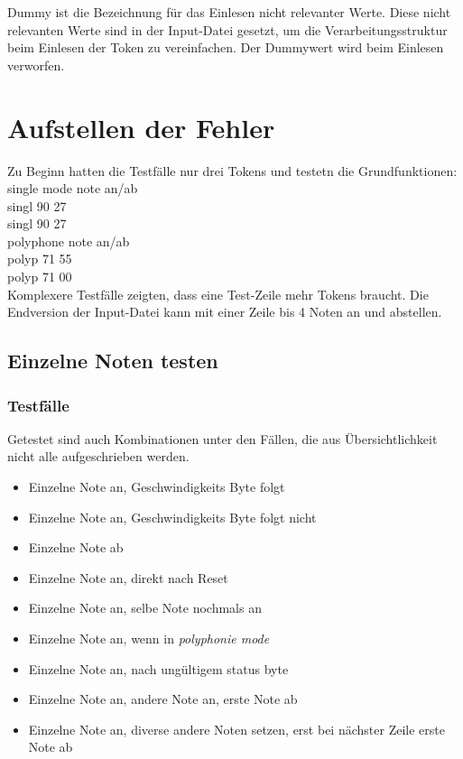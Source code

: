 Dummy ist die Bezeichnung für das Einlesen nicht relevanter Werte. Diese nicht relevanten Werte sind in der Input-Datei gesetzt, um die Verarbeitungsstruktur beim Einlesen der Token zu vereinfachen. Der Dummywert wird beim Einlesen verworfen.\\
 
\section{Aufstellen der Fehler}\label{sec.testbench_fehler} 

Zu Beginn hatten die Testfälle nur drei Tokens und testetn die Grundfunktionen:\\

single mode note an/ab\\
singl 90 27\\ 
singl 90 27\\

polyphone note an/ab\\
polyp 71 55\\
polyp 71 00\\

Komplexere Testfälle zeigten, dass eine Test-Zeile mehr Tokens braucht. Die Endversion der Input-Datei kann mit einer Zeile bis 4 Noten an und abstellen.


\subsection{Einzelne Noten testen}
 
\subsubsection{Testfälle}
Getestet sind auch Kombinationen unter den Fällen, die aus Übersichtlichkeit nicht alle aufgeschrieben werden.\\
\begin{itemize}
\item Einzelne Note an, Geschwindigkeits Byte folgt
\item Einzelne Note an, Geschwindigkeits Byte folgt nicht
\item Einzelne Note ab
\item Einzelne Note an, direkt nach Reset
\item Einzelne Note an, selbe Note nochmals an
\item Einzelne Note an, wenn in \textit{polyphonie mode}
\item Einzelne Note an, nach ungültigem status byte
\item Einzelne Note an, andere Note an, erste Note ab
\item Einzelne Note an, diverse andere Noten setzen, erst bei nächster Zeile erste Note ab
\end{itemize}

